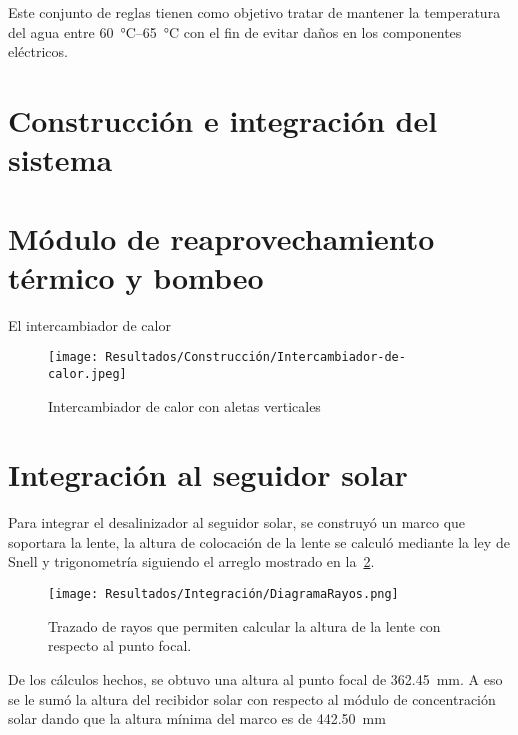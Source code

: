 			Este conjunto de reglas tienen como objetivo tratar de mantener la temperatura del agua entre \qtyrange{60}{65}{\degreeCelsius} con el fin de evitar daños en los componentes eléctricos.
	
	
	\section{Construcción e integración del sistema}
		
		\section{Módulo de reaprovechamiento térmico y bombeo}
		
			El intercambiador de calor 
			
			\begin{figure}[H]
				\centering
				\texttt{[image: Resultados/Construcción/Intercambiador-de-calor.jpeg]}
				\caption{Intercambiador de calor con aletas verticales}
				\label{fig:Intercambiador-de-calor.jpeg}
			\end{figure}
		
	
	\section{Integración al seguidor solar}
	
		Para integrar el desalinizador al seguidor solar, se construyó un marco que soportara la lente, la altura de colocación de la lente se calculó mediante la ley de Snell y trigonometría siguiendo el arreglo mostrado en la~\cref{fig:DiagramaRayos}.
		
		\begin{figure}[H]
			\centering
			\texttt{[image: Resultados/Integración/DiagramaRayos.png]}
			\caption{Trazado de rayos que permiten calcular la altura de la lente con respecto al punto focal.}
			\label{fig:DiagramaRayos}
		\end{figure}
		
		
		De los cálculos hechos, se obtuvo una altura al punto focal de \qty{362.45}{\mm}. A eso se le sumó la altura del recibidor solar con respecto al módulo de concentración solar dando que la altura mínima del marco es de \qty{442.50}{\mm}
		
			
			


			
			
			
			